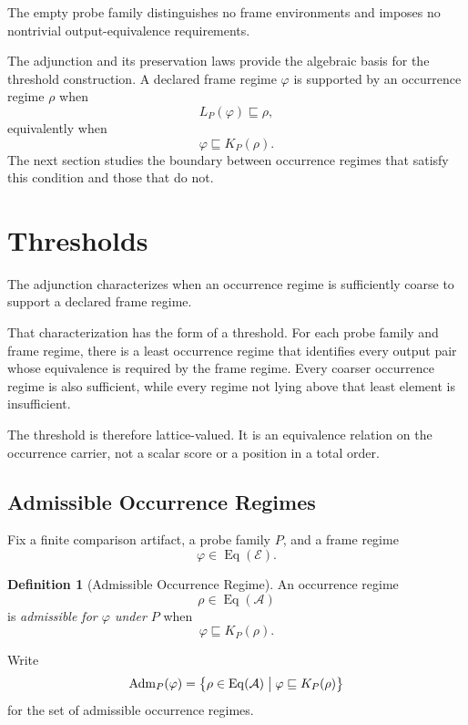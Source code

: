\documentclass[11pt]{article}
\theoremstyle{plain}
\theoremstyle{definition}
\newtheorem{definition}[theorem]{Definition}
\theoremstyle{remark}
\begin{document}
The empty probe family distinguishes no frame environments
and imposes no nontrivial output-equivalence requirements.

The adjunction and its preservation laws
provide the algebraic basis for the threshold construction.
A declared frame regime \(\varphi\)
is supported by an occurrence regime \(\rho\) when
\[
  L_P(\varphi)
  \sqsubseteq
  \rho,
\]
equivalently when
\[
  \varphi
  \sqsubseteq
  K_P(\rho).
\]
The next section studies the boundary
between occurrence regimes that satisfy this condition
and those that do not.

\section{Thresholds}
\label{ik.sec.thresholds}

The adjunction characterizes when an occurrence regime
is sufficiently coarse
to support a declared frame regime.

That characterization has the form of a threshold.
For each probe family and frame regime,
there is a least occurrence regime
that identifies every output pair
whose equivalence is required by the frame regime.
Every coarser occurrence regime is also sufficient,
while every regime not lying above that least element is insufficient.

The threshold is therefore lattice-valued.
It is an equivalence relation on the occurrence carrier,
not a scalar score or a position in a total order.

\subsection{Admissible Occurrence Regimes}

Fix a finite comparison artifact,
a probe family \(P\),
and a frame regime
\[
  \varphi
  \in
  \operatorname{Eq}(\mathcal{E}).
\]

\begin{definition}[Admissible Occurrence Regime]
  \label{ik.def.admissible}
  An occurrence regime
  \[
    \rho
    \in
    \operatorname{Eq}(\mathcal{A})
  \]
  is \emph{admissible for \(\varphi\) under \(P\)}
  when
  \[
    \varphi
    \sqsubseteq
    K_P(\rho).
  \]

  Write
  \[
    \operatorname{Adm}_P(\varphi)
    =
    \bigl\{
    \rho
    \in
    \operatorname{Eq}(\mathcal{A})
    \bigm|
    \varphi
    \sqsubseteq
    K_P(\rho)
    \bigr\}
  \]
  for the set of admissible occurrence regimes.
\end{definition}
\end{document}
